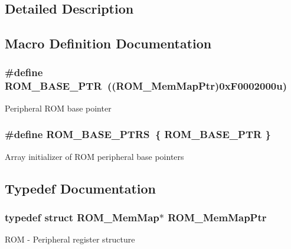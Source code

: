 \subsection{Detailed Description}


\subsection{Macro Definition Documentation}
\hypertarget{group___r_o_m___peripheral_ga5ad426d10b6832ca7012e8767113f686}{}
\subsubsection[{R\+O\+M\+\_\+\+B\+A\+S\+E\+\_\+\+P\+T\+R}]{\setlength{\rightskip}{0pt plus 5cm}\#define R\+O\+M\+\_\+\+B\+A\+S\+E\+\_\+\+P\+T\+R~(({\bf R\+O\+M\+\_\+\+Mem\+Map\+Ptr})0x\+F0002000u)}\label{group___r_o_m___peripheral_ga5ad426d10b6832ca7012e8767113f686}
Peripheral R\+O\+M base pointer \hypertarget{group___r_o_m___peripheral_ga41e000a3e59f16dd8f395cebcb883e82}{}
\subsubsection[{R\+O\+M\+\_\+\+B\+A\+S\+E\+\_\+\+P\+T\+R\+S}]{\setlength{\rightskip}{0pt plus 5cm}\#define R\+O\+M\+\_\+\+B\+A\+S\+E\+\_\+\+P\+T\+R\+S~\{ {\bf R\+O\+M\+\_\+\+B\+A\+S\+E\+\_\+\+P\+T\+R} \}}\label{group___r_o_m___peripheral_ga41e000a3e59f16dd8f395cebcb883e82}
Array initializer of R\+O\+M peripheral base pointers 

\subsection{Typedef Documentation}
\hypertarget{group___r_o_m___peripheral_ga443285c54b394d010d2dccd28607e4b4}{}
\subsubsection[{R\+O\+M\+\_\+\+Mem\+Map\+Ptr}]{\setlength{\rightskip}{0pt plus 5cm}typedef struct {\bf R\+O\+M\+\_\+\+Mem\+Map}$\ast$ {\bf R\+O\+M\+\_\+\+Mem\+Map\+Ptr}}\label{group___r_o_m___peripheral_ga443285c54b394d010d2dccd28607e4b4}
R\+O\+M -\/ Peripheral register structure 